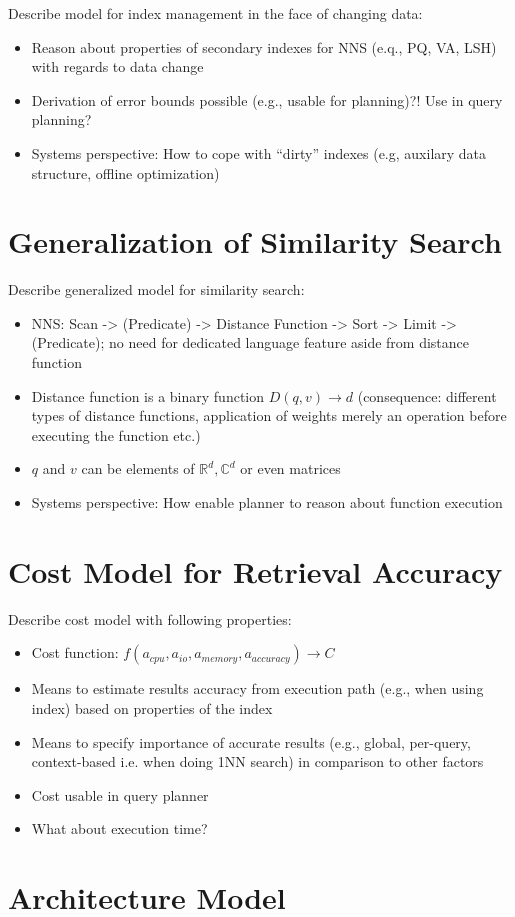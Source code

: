 Describe model for index management in the face of changing data:

\begin{itemize}
    \item Reason about properties of secondary indexes for NNS (e.q., PQ, VA, LSH) with regards to data change
    \item Derivation of error bounds possible (e.g., usable for planning)?! Use in query planning?
    \item Systems perspective: How to cope with ``dirty'' indexes (e.g, auxilary data structure, offline optimization)
\end{itemize}

\section{Generalization of Similarity Search}

Describe generalized model for similarity search:

\begin{itemize}
    \item NNS: Scan -> (Predicate) -> Distance Function -> Sort -> Limit -> (Predicate); no need for dedicated language feature aside from distance function
    \item Distance function is a binary function $D(q,v) \longrightarrow d$ (consequence: different types of distance functions, application of weights merely an operation before executing the function etc.)
    \item $q$ and $v$ can be elements of $\mathbb{R}^d,\mathbb{C}^d$ or even matrices
    \item Systems perspective: How enable planner to reason about function execution
\end{itemize}

\section{Cost Model for Retrieval Accuracy}
Describe cost model with following properties:

\begin{itemize}
    \item Cost function: $f(a_{cpu}, a_{io}, a_{memory}, a_{accuracy}) \longrightarrow C$
    \item Means to estimate results accuracy from execution path (e.g., when using index) based on properties of the index
    \item Means to specify importance of accurate results (e.g., global, per-query, context-based i.e. when doing 1NN search) in comparison to other factors
    \item Cost usable in query planner
    \item What about execution time?
\end{itemize}

\section{Architecture Model}





